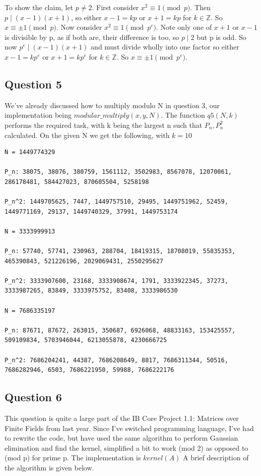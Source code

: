 \documentclass[10pt,a4paper]{report}
\begin{document}
To show the claim, let $p\neq2$. First consider $x^2\equiv 1 \pmod p$. Then $p \mid (x-1)(x+1)$, so either $x-1=kp$ or $x+1=kp$ for $k\in\mathbb{Z}$. So $x\equiv\pm 1 \pmod p$. Now consider $x^2\equiv 1 \pmod{p^e}$. Note only one of $x+1$ or $x-1$ is divisible by p, as if both are, their difference is too, so $p \mid 2$ but p is odd. So now $p^e \mid (x-1)(x+1)$ and must divide wholly into one factor so either $x-1=kp^e$ or $x+1=kp^e$ for $k\in\mathbb{Z}$. So $x\equiv\pm 1 \pmod{p^e}$.

\subsection*{Question 5}

We've already discussed how to multiply modulo N in question 3, our implementation being $modular\_multiply(x,y,N)$. The function $q5(N,k)$ performs the required task, with k being the largest n such that $P_n, P_n^2$ calculated. On the given N we get the following, with $k=10$


\begin{lstlisting}[breaklines]	
N = 1449774329

P_n: 38075, 38076, 380759, 1561112, 3502983, 8567078, 12070061, 286178481, 584427023, 870605504, 5258198

P_n^2: 1449705625, 7447, 1449757510, 29495, 1449751962, 52459, 1449771169, 29137, 1449740329, 37991, 1449753174

N = 3333999913

P_n: 57740, 57741, 230963, 288704, 18419315, 18708019, 55835353, 465390843, 521226196, 2029069431, 2550295627

P_n^2: 3333907600, 23168, 3333908674, 1791, 3333922345, 37273, 3333987265, 83849, 3333975752, 83408, 3333986530

N = 7686335197

P_n: 87671, 87672, 263015, 350687, 6926068, 48833163, 153425557, 509109834, 5703946044, 6213055878, 4230666725

P_n^2: 7686204241, 44387, 7686208649, 8817, 7686311344, 50516, 7686282946, 6503, 7686221950, 59988, 7686222176
\end{lstlisting}

\subsection*{Question 6}

This question is quite a large part of the IB Core Project 1.1: Matrices over Finite Fields from last year. Since I've switched programming language, I've had to rewrite the code, but have used the same algorithm to perform Gaussian elimination and find the kernel, simplified a bit to work (mod 2) as opposed to (mod p) for prime p. The implementation is $kernel(A)$ A brief description of the algorithm is given below.\\
\end{document}
